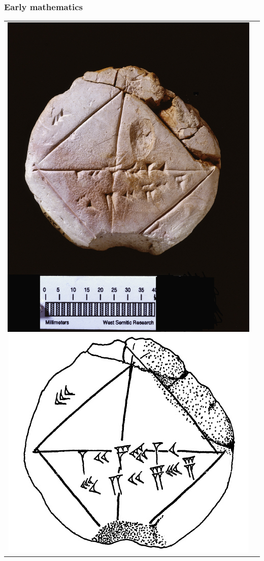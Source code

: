 \documentclass[11pt]{beamer}
\begin{document}
\begin{frame}[fragile]
  \frametitle{Early mathematics}

  \begin{tabular}{cc}
  \includegraphics[height=0.75\textheight]{./img/ybc7289.jpg}
  \includegraphics[height=0.375\textheight]{./img/ybc7289-schematic.jpg}
  \end{tabular}
\end{frame}
\end{document}
